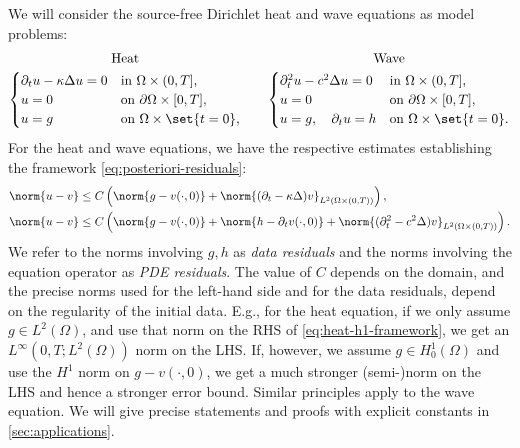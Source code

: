 We will consider the source-free Dirichlet heat and wave equations as model problems:
\begin{equation}\label{eq:heat-wave-model-framework}
\begin{array}{@{}c@{\qquad}c@{}}
\text{Heat} & \text{Wave} \\[0.3em]
\begin{cases}
\partial_t u-\kappa\Delta u=0 & \text{in }\Omega\times(0,T],\\
u=0 & \text{on }\partial\Omega\times[0,T],\\
u=g & \text{on }\Omega\times\set{t=0},
\end{cases}
&
\begin{cases}
\partial_t^2 u-c^2\Delta u=0 & \text{in }\Omega\times(0,T],\\
u=0 & \text{on }\partial\Omega\times[0,T],\\
u=g,\quad \partial_tu=h & \text{on }\Omega\times\set{t=0}.
\end{cases}
\end{array}
\end{equation}
For the heat and wave equations, we have the respective estimates establishing the framework \eqref{eq:posteriori-residuals}:
\begin{align}
    \norm{u-v}
    &\leq
    C\left(
    \norm{g-v(\cdot,0)}
    +\norm{(\partial_t-\kappa\Delta)v}_{L^2(\Omega\times(0,T))}
    \right),
    \label{eq:heat-h1-framework}\\
    \norm{u-v}
    &\leq
    C\left(
    \norm{g-v(\cdot,0)}
    +\norm{h-\partial_t v(\cdot,0)}
    +\norm{(\partial_t^2-c^2\Delta)v}_{L^2(\Omega\times(0,T))}
    \right).
    \label{eq:wave-h1-framework}
\end{align}
We refer to the norms involving $g, h$ as \emph{data residuals} and the norms involving the equation operator as \emph{PDE residuals}. The value of $C$ depends on the domain, and the precise norms used for the left-hand side and for the data residuals, depend on the regularity of the initial data. E.g., for the heat equation, if we only assume $g\in L^2(\Omega)$, and use that norm on the RHS of \eqref{eq:heat-h1-framework}, we get an $L^\infty(0,T;L^2(\Omega))$ norm on the LHS. If, however, we assume $g\in H^1_0(\Omega)$ and use the $H^1$ norm on $g - v(\cdot,0)$, we get a much stronger (semi-)norm on the LHS and hence a stronger error bound. Similar principles apply to the wave equation. We will give precise statements and proofs with explicit constants in \cref{sec:applications}.




